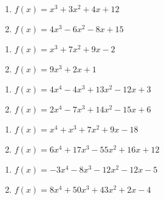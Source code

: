 \begin{multicols}{2}
\begin{enumerate}
\setcounter{enumi}{\value{HW}}

\item $f(x) = x^3 + 3x^2 + 4x + 12$
\item $f(x) = 4x^3-6x^2-8x+15$

\setcounter{HW}{\value{enumi}}
\end{enumerate}
\end{multicols}

\begin{multicols}{2}
\begin{enumerate}
\setcounter{enumi}{\value{HW}}


\item  $f(x) = x^3 + 7x^2+9x-2$
\item  $f(x) = 9x^3+2x+1$

\setcounter{HW}{\value{enumi}}
\end{enumerate}
\end{multicols}


\begin{multicols}{2}
\begin{enumerate}
\setcounter{enumi}{\value{HW}}

\item $f(x) = 4x^{4} - 4x^{3} + 13x^{2} - 12x + 3$
\item $f(x) = 2x^4-7x^3+14x^2-15x+6$



\setcounter{HW}{\value{enumi}}
\end{enumerate}
\end{multicols}

\begin{multicols}{2}
\begin{enumerate}
\setcounter{enumi}{\value{HW}}

\item  $f(x) = x^4+x^3+7x^2+9x-18$
\item  $f(x) = 6x^4+17x^3-55x^2+16x+12$


\setcounter{HW}{\value{enumi}}
\end{enumerate}
\end{multicols}


\begin{multicols}{2}
\begin{enumerate}
\setcounter{enumi}{\value{HW}}

\item  $f(x) = -3x^4-8x^3-12x^2-12x-5$
\item  $f(x) = 8x^4+50x^3+43x^2+2x-4$


\setcounter{HW}{\value{enumi}}
\end{enumerate}
\end{multicols}

